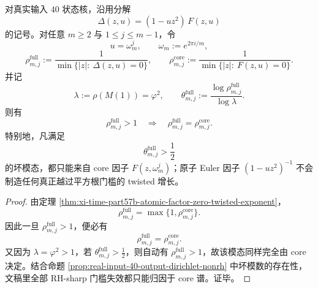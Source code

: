 \begin{theorem}\label{thm:conclusion-realinput40-core-determined-twisted-rh-break}
对真实输入 \(40\) 状态核，沿用分解
\[
\Delta(z,u)=(1-uz^2)\,F(z,u)
\]
的记号。对任意 \(m\ge 2\) 与 \(1\le j\le m-1\)，令
\[
u=\omega_m^j,
\qquad
\omega_m:=e^{2\pi i/m},
\]
\[
\rho_{m,j}^{\mathrm{full}}
:=
\frac{1}{\min\{|z|:\ \Delta(z,u)=0\}},
\qquad
\rho_{m,j}^{\mathrm{core}}
:=
\frac{1}{\min\{|z|:\ F(z,u)=0\}}.
\]
并记
\[
\lambda:=\rho(M(1))=\varphi^2,
\qquad
\theta_{m,j}^{\mathrm{full}}
:=
\frac{\log\rho_{m,j}^{\mathrm{full}}}{\log\lambda}.
\]
则有
\[
\boxed{\;
\rho_{m,j}^{\mathrm{full}}>1
\quad\Longrightarrow\quad
\rho_{m,j}^{\mathrm{full}}=\rho_{m,j}^{\mathrm{core}}.\;}
\]
特别地，凡满足
\[
\theta_{m,j}^{\mathrm{full}}>\frac12
\]
的坏模态，都只能来自 core 因子 \(F(z,\omega_m^j)\)；原子 Euler 因子 \((1-uz^2)^{-1}\) 不会制造任何真正越过平方根门槛的 twisted 增长。
\end{theorem}
\begin{proof}
由定理 \ref{thm:xi-time-part57b-atomic-factor-zero-twisted-exponent}，
\[
\rho_{m,j}^{\mathrm{full}}=\max\{1,\rho_{m,j}^{\mathrm{core}}\}.
\]
因此一旦 \(\rho_{m,j}^{\mathrm{full}}>1\)，便必有
\[
\rho_{m,j}^{\mathrm{full}}=\rho_{m,j}^{\mathrm{core}}.
\]
又因为 \(\lambda=\varphi^2>1\)，若 \(\theta_{m,j}^{\mathrm{full}}>\tfrac12\)，则自动有 \(\rho_{m,j}^{\mathrm{full}}>1\)，故该模态同样完全由 core 决定。结合命题 \ref{prop:real-input-40-output-dirichlet-nonrh} 中坏模数的存在性，文稿里全部 RH-sharp 门槛失效都只能归因于 core 谱。证毕。
\end{proof}

